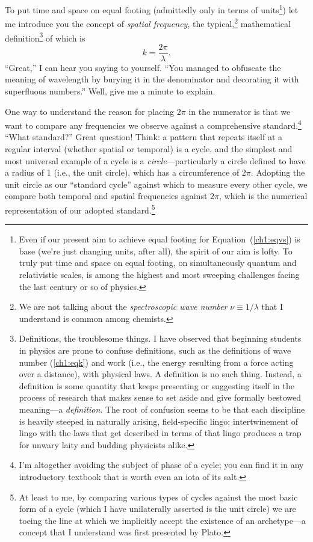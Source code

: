 To put time and space on equal footing (admittedly only in terms of
units\footnote{Even if our present aim to achieve equal footing for
  Equation~(\ref{ch1:eqvs}) is base (we're just changing units, after all), the
  spirit of our aim is lofty. To truly put time and space on equal footing, on
  simultaneously quantum and relativistic scales, is among the highest and most
  sweeping challenges facing the last century or so of physics.}) let me
introduce you the concept of \emph{spatial frequency}, the typical,\footnote{We
  are not talking about the \emph{spectroscopic wave number}
  $\nu \equiv 1 / \lambda$ that I understand is common among chemists.}
mathematical definition\footnote{Definitions, the troublesome things. I have
  observed that beginning students in physics are prone to confuse definitions,
  such as the definitions of wave number (\ref{ch1:eqk}) and work (i.e., the
  energy resulting from a force acting over a distance), with physical laws. A
  definition is no such thing. Instead, a definition is some quantity that keeps
  presenting or suggesting itself in the process of research that makes sense to
  set aside and give formally bestowed meaning---a \emph{definition}. The root
  of confusion seems to be that each discipline is heavily steeped in naturally
  arising, field-specific lingo; intertwinement of lingo with the laws that get
  described in terms of that lingo produces a trap for unwary laity and budding
  physicists alike.} of which is
\begin{equation}
  \label{ch1:eqk}
  k = \dfrac{2 \pi}{\lambda}.
\end{equation}
``Great,'' I can hear you saying to yourself. ``You managed to obfuscate the
meaning of wavelength by burying it in the denominator and decorating it with
superfluous numbers.'' Well, give me a minute to explain.

One way to understand the reason for placing $2 \pi$ in the numerator is that we
want to compare any frequencies we observe against a comprehensive
standard.\footnote{I'm altogether avoiding the subject of phase of a cycle; you
  can find it in any introductory textbook that is worth even an iota of its
  salt.} ``What standard?'' Great question! Think: a pattern that repeats itself
at a regular interval (whether spatial or temporal) is a cycle, and the simplest
and most universal example of a cycle is a \emph{circle}---particularly a circle
defined to have a radius of 1 (i.e., the unit circle), which has a circumference
of $2 \pi$.  Adopting the unit circle as our ``standard cycle'' against which to
measure every other cycle, we compare both temporal and spatial frequencies
against $2 \pi$, which is the numerical representation of our adopted
standard.\footnote{At least to me, by comparing various types of cycles against
  the most basic form of a cycle (which I have unilaterally asserted is the unit
  circle) we are toeing the line at which we implicitly accept the existence of
  an archetype---a concept that I understand was first presented by Plato.}

